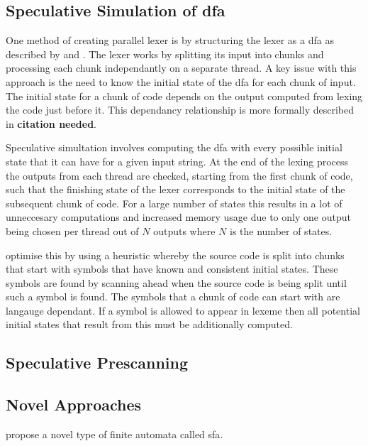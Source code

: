 \subsection{Speculative Simulation of \ac{dfa}}

One method of creating parallel lexer is by structuring the lexer
as a \ac{dfa} as described by \cite{barenghi_parallel_2015} and
\cite{mytkowicz_data-parallel_2014}. The lexer works by splitting its input into
chunks and processing each chunk independantly on a separate thread. A key issue
with this approach is the need to know the initial state of the \ac{dfa} for
each chunk of input. The initial state for a chunk of code depends on the output
computed from lexing the code just before it. This dependancy relationship is
more formally described in \textbf{citation needed}. 

Speculative simultation involves computing the \ac{dfa} with every possible
initial state that it can have for a given input string. At the end of the
lexing process the outputs from each thread are checked, starting from the
first chunk of code, such that the finishing state of the lexer corresponds to
the initial state of the subsequent chunk of code. For a large number of states
this results in a lot of unneccesary computations and increased memory usage due
to only one output being chosen per thread out of $N$ outputs where $N$ is the
number of states.

\cite{barenghi_parallel_2015} optimise this by using a heuristic whereby the
source code is split into chunks that start with symbols that have known and
consistent initial states. These symbols are found by scanning ahead when the
source code is being split until such a symbol is found. The symbols that a
chunk of code can start with are langauge dependant.  If a symbol is allowed to
appear in lexeme then all potential  initial states that result from this must
be additionally computed.

\subsection{Speculative Prescanning}
\cite{li_plex_2021}

\subsection{Novel Approaches}
\cite{sinya_simultaneous_2013} propose a novel type of finite automata called
\ac{sfa}.

\cite{lin_accelerating_2013}

